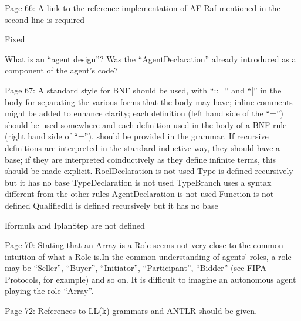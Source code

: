 \documentclass{article}
\newcommand{\todo}[1]{[\textcolor{red}{TODO}: #1]}
\newenvironment{them}{\noindent\begingroup\color{blue}}{\endgroup\par}
\begin{document}
\begin{them}

Page 66:
A link to the reference implementation of AF-Raf mentioned in the second line is required
\end{them}
Fixed

\begin{them}

What is an “agent design”? Was the “AgentDeclaration” already introduced as a component of the
agent's code?
\end{them}
\todo{explain}

\begin{them}

Page 67:
A standard style for BNF should be used, with “::=” and “|” in the body for separating the various
forms that the body may have; inline comments might be added to enhance clarity; each definition
(left hand side of the “=”) should be used somewhere and each definition used in the body of a BNF
rule (right hand side of “=”), should be provided in the grammar. If recursive definitions are
interpreted in the standard inductive way, they should have a base; if they are interpreted
coinductively as they define infinite terms, this should be made explicit.
RoelDeclaration is not used
Type is defined recursively but it has no base
TypeDeclaration is not used
TypeBranch uses a syntax different from the other rules
AgentDeclaration is not used
Function is not defined
QualifiedId is defined recursively but it has no base
\end{them}
\todo{}

\begin{them}

Iformula and IplanStep are not defined
\end{them}
\todo{}

\begin{them}

Page 70:
Stating that an Array is a Role seems not very close to the common intuition of what a Role is.In the
common understanding of agents' roles, a role may be “Seller”, “Buyer”, “Initiator”, “Participant”,
“Bidder” (see FIPA Protocols, for example) and so on. It is difficult to imagine an autonomous agent
playing the role “Array”.
\end{them}
\todo{}

\begin{them}

Page 72:
References to LL(k) grammars and ANTLR should be given.
\end{them}
\todo{}
\end{document}

